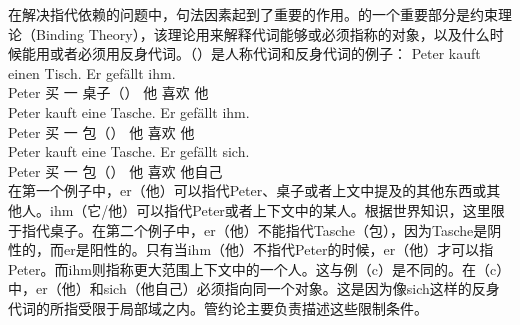 在解决指代依赖的问题中，句法因素\label{Seite-Bindungstheorie}起到了重要的作用。\gbtc 的一个重要部分是约束理论（Binding Theory），该理论用来解释代词能够或必须指称的对象，以及什么时候能用或者必须用反身代词。（）是人称代词和反身代词的例子：
\eal
\ex 
\gll Peter kauft einen Tisch. Er gefällt ihm.\\
	 Peter 买 一 桌子（\mas{}） 他 喜欢 他\\
\ex 
\gll Peter kauft eine Tasche. Er gefällt ihm.\\
	 Peter 买 一 包（\fem{}） 他 喜欢 他\\
\ex 
\gll Peter kauft eine Tasche. Er gefällt sich.\\
	 Peter 买 一 包（\fem{}） 他 喜欢 他自己\\
\zl
在第一个例子中，er（他）可以指代Peter、桌子或者上文中提及的其他东西或其他人。ihm（它/他）可以指代Peter或者上下文中的某人。根据世界知识，这里限于指代桌子。在第二个例子中，er（他）不能指代Tasche（包），因为Tasche是阴性的，而er是阳性的。只有当ihm（他）不指代Peter的时候，er（他）才可以指Peter。而ihm则指称更大范围上下文中的一个人。这与例（c）是不同的。在（c）中，er（他）和sich（他自己）必须指向同一个对象。这是因为像sich这样的反身代词的所指受限于局部域之内。管约论主要负责描述这些限制条件。

